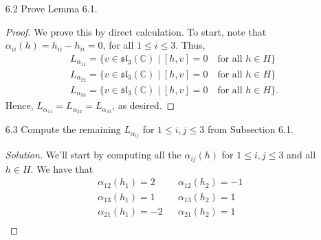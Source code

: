 \documentclass[12pt]{article}
\theoremstyle{definition}
\theoremstyle{definition}
\newenvironment{solution}
  {\renewcommand\qedsymbol{$\blacksquare$}\begin{proof}[Solution]}
  {\end{proof}}
\begin{document}
\begin{enumerate}
\begin{solution}
\begin{align*}
                    &\text{ad}_{h_1}(x_1)=2x_1& &\text{ad}_{h_2}(x_1)=-x_1& \\
                    &\text{ad}_{h_1}(x_2)=-x_2& &\text{ad}_{h_2}(x_2)=2x_2& \\
                    &\text{ad}_{h_1}(x_3)=x_3& &\text{ad}_{h_2}(x_3)=x_3& \\
                    &\text{ad}_{h_1}(y_1)=-2y_1& &\text{ad}_{h_2}(y_1)=y_1& \\
                    &\text{ad}_{h_1}(y_2)=y_2& &\text{ad}_{h_2}(y_2)=-2y_2 \\
                    &\text{ad}_{h_1}(y_3)=-y_3& &\text{ad}_{h_2}(y_3)=-y_3&
                \end{align*}
            \end{solution}
        \item[6.2] Prove Lemma 6.1.
            \begin{proof}
                We prove this by direct calculation. To start, note that
                $\alpha_{ii}(h)=h_{ii}-h_{ii}=0$, for all $1\leq i\leq 3$. Thus,
                \begin{align*}
                    &L_{\alpha_{11}}=\{v\in\mathfrak{sl}_3(\mathbb{C})\mid[h,
                    v]=0\quad\text{for all }h\in H\} \\
                    &L_{\alpha_{22}}=\{v\in\mathfrak{sl}_3(\mathbb{C})\mid[h,
                    v]=0\quad\text{for all }h\in H\} \\
                    &L_{\alpha_{33}}=\{v\in\mathfrak{sl}_3(\mathbb{C})\mid[h,
                    v]=0\quad\text{for all }h\in H\}.
                \end{align*}
                Hence, $L_{\alpha_{11}}=L_{\alpha_{22}}=L_{\alpha_{33}}$, as
                desired.
            \end{proof}
        \item[6.3] Compute the remaining $L_{\alpha_{ij}}$ for $1\leq i, j\leq
            3$ from Subsection 6.1.
            \begin{solution}
                We'll start by computing all the $\alpha_{ij}(h)$ for $1\leq i,
                j\leq 3$ and all $h\in H$. We have that
                \begin{align*}
                    &\alpha_{12}(h_1)=2& &\alpha_{12}(h_2)=-1& \\
                    &\alpha_{13}(h_1)=1& &\alpha_{13}(h_2)=1& \\
                    &\alpha_{21}(h_1)=-2& &\alpha_{21}(h_2)=1& \\

\end{align*}
\end{solution}
\end{enumerate}
\end{document}
